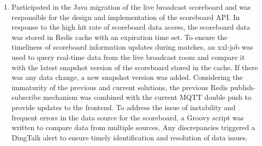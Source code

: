 \documentclass{resume}
\newcommand{\en}[1]{#1}
\newcommand{\zh}[1]{}
\begin{document}
\begin{itemize}
\begin{enumerate}
            	 \item \en{Participated in the Java migration of the live broadcast scoreboard and was responsible for the design and implementation of the scoreboard API. In response to the high hit rate of scoreboard data access, the scoreboard data was stored in Redis cache with an expiration time set. To ensure the timeliness of scoreboard information updates during matches, an xxl-job was used to query real-time data from the live broadcast room and compare it with the latest snapshot version of the scoreboard stored in the cache. If there was any data change, a new snapshot version was added. Considering the immaturity of the previous and current solutions, the previous Redis publish-subscribe mechanism was combined with the current MQTT double push to provide updates to the frontend. To address the issue of instability and frequent errors in the data source for the scoreboard, a Groovy script was written to compare data from multiple sources. Any discrepancies triggered a DingTalk alert to ensure timely identification and resolution of data issues.}
	 	 \zh{参与比赛直播间比分牌的Java化，负责比分牌API接又的设计与实现。针对比分牌数据访问命中 率高问题，将比分数据放在Redis缓存并设置过期时间。为了保证比赛中比分牌信息变更的及时 性，采用xxl-job定时去查询直播间实时数据，再与缓存中比分牌最新的快照版本进行比较，如 果有数据变更则添加新快照版本，又考虑之前和现在方案存在不成熟情况，采用之前的Redis发 布订阅和现在MQTT 双推送的方式给前端。考虑数据源比分数据经常不稳定容易出错问题，写 Groovy脚本多数据源比较，不一致则发送钉钉报警，做好风险预警和及时解决数据问题。}\\
            \end{enumerate}
\end{itemize}
\end{document}
